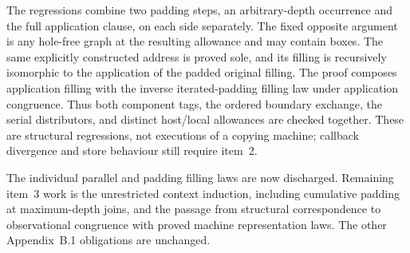 The regressions combine two padding steps, an arbitrary-depth occurrence and
the full application clause, on each side separately. The fixed opposite
argument is any hole-free graph at the resulting allowance and may contain
boxes. The same explicitly constructed address is proved sole, and its filling
is recursively isomorphic to the application of the padded original filling.
The proof composes application filling with the inverse iterated-padding
filling law under application congruence. Thus both component tags, the ordered
boundary exchange, the serial distributors, and distinct host/local allowances
are checked together. These are structural regressions, not executions of a
copying machine; callback divergence and store behaviour still require item~2.

The individual parallel and padding filling laws are now discharged. Remaining
item~3 work is the unrestricted context induction, including cumulative padding
at maximum-depth joins, and the passage from structural correspondence to
observational congruence with proved machine representation laws. The other
Appendix~B.1 obligations are unchanged.



